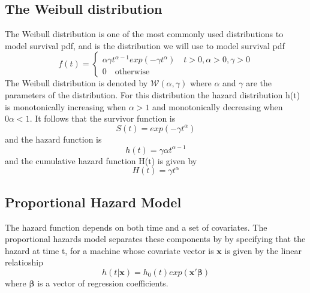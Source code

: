 \documentclass[english]{article}
\numberwithin{equation}{section}
\begin{document}
\subsection*{The Weibull distribution}
The Weibull distribution is one of the most commonly used distributions to model survival pdf, and is the distribution we will use to model survival pdf
\begin{equation}
f(t)=\begin{cases}
\alpha \gamma t^{\alpha -1}exp(-\gamma t^{\alpha}) \quad t>0, \alpha >0, \gamma>0\\
0 \quad \text{otherwise}
\end{cases}
\end{equation}
The Weibull distribution is denoted by $\mathcal{W}(\alpha, \gamma)$ where $\alpha$ and $\gamma$ are the parameters of the distribution.  For this distribution the hazard distribution h(t) is monotonically increasing when $\alpha >1$ and monotonically decreasing when $0 \alpha < 1$.  It follows that
the survivor function is 
\begin{equation} \label{eq:W}
S(t)=exp(-\gamma t^\alpha)
\end{equation}
and the hazard function is
\begin{equation}
h(t)=\gamma \alpha t^{\alpha -1}
\end{equation}
and the cumulative hazard function H(t) is given by
\begin{equation}
H(t)=\gamma t ^\alpha
\end{equation}
\subsection*{Proportional Hazard Model}
The hazard function depends on both time and a set of covariates.  The proportional hazards model separates these components by by specifying that the hazard at time t, for a machine whose covariate vector is $\mathbf{x}$ is given by the linear relatioship
\begin{equation}
h(t|\mathbf{x})=h_0(t) exp(\mathbf{x}' \mathbf{\beta})
\end{equation}
where $\mathbf{\beta}$ is a vector of regression coefficients.
\end{document}

